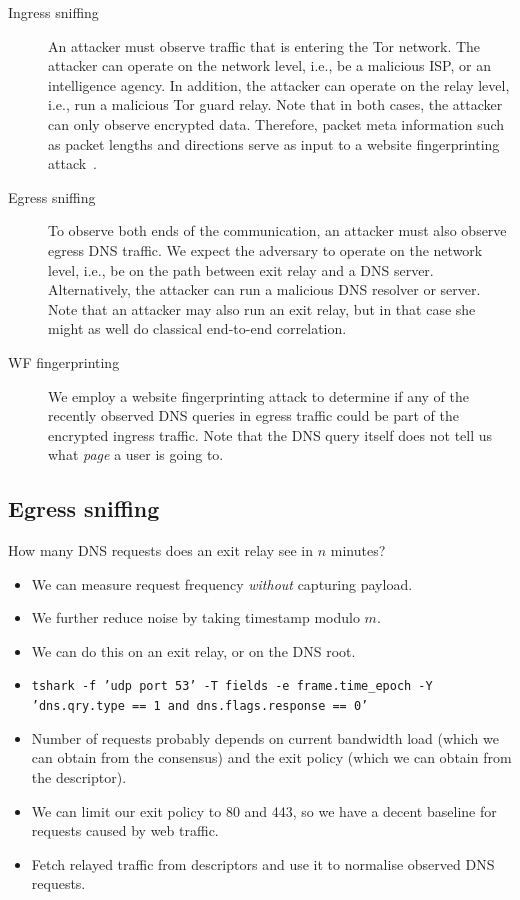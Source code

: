 \begin{description}
	\item[Ingress sniffing] An attacker must observe traffic that is entering
		the Tor network.  The attacker can operate on the network level, i.e.,
		be a malicious ISP, or an intelligence agency.  In addition, the
		attacker can operate on the relay level, i.e., run a malicious Tor guard
		relay.  Note that in both cases, the attacker can only observe encrypted
		data.  Therefore, packet meta information such as packet lengths and
		directions serve as input to a website fingerprinting
		attack~\cite{Panchenko2016a}.
	\item[Egress sniffing] To observe both ends of the communication, an
		attacker must also observe egress DNS traffic.  We expect the adversary
		to operate on the network level, i.e., be on the path between exit relay
		and a DNS server.  Alternatively, the attacker can run a malicious DNS
		resolver or server.  Note that an attacker may also run an exit relay,
		but in that case she might as well do classical end-to-end correlation.
	\item[WF fingerprinting] We employ a website fingerprinting attack to
		determine if any of the recently observed DNS queries in egress traffic
		could be part of the encrypted ingress traffic.  Note that the DNS query
		itself does not tell us what \emph{page} a user is going to.
\end{description}

\subsection{Egress sniffing}

How many DNS requests does an exit relay see in $n$ minutes?
\begin{itemize}
	\item We can measure request frequency \emph{without} capturing payload.
	\item We further reduce noise by taking timestamp modulo $m$.
	\item We can do this on an exit relay, or on the DNS root.
	\item \texttt{tshark -f 'udp port 53' -T fields -e frame.time\_epoch -Y 'dns.qry.type == 1 and dns.flags.response == 0'}
	\item Number of requests probably depends on current bandwidth load (which
		we can obtain from the consensus) and the exit policy (which we can
		obtain from the descriptor).
	\item We can limit our exit policy to 80 and 443, so we have a decent
		baseline for requests caused by web traffic.
	\item Fetch relayed traffic from descriptors and use it to normalise
		observed DNS requests.
\end{itemize}

